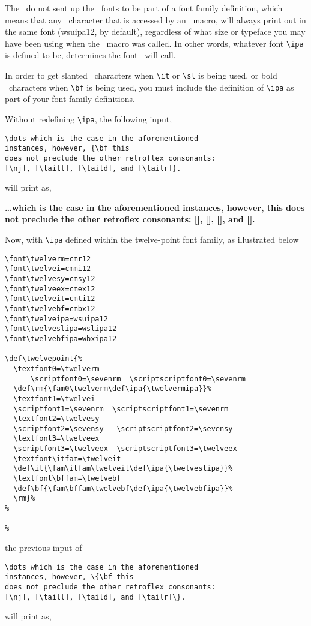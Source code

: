 The \ipam\ do not sent up the \wsu\ fonts to be part of a font family
definition, which means that any \wsu\ character that is accessed by
an \ipam\
macro, will always print out in the same font (wsuipa12, by default),
regardless of what size or typeface you may have been using when
the \ipam\
macro was called. In other words, whatever font \verb?\ipa? is defined to be,
determines the font \ipam\ will call.

In order to get slanted \wsu\ characters when \verb?\it? or \verb?\sl? is being used, or
bold \wsu\ characters when \verb?\bf? is being used, you must include the definition
of \verb?\ipa? as part of your font family definitions.

Without redefining \verb?\ipa?, the following input,

\begin{verbatim}
\dots which is the case in the aforementioned
instances, however, {\bf this
does not preclude the other retroflex consonants:
[\nj], [\taill], [\taild], and [\tailr]}.
\end{verbatim}
\noindent will print as,

\vs{5pt}
{\bf \dots which is the case in the aforementioned instances, however, {\bf this
does not preclude the other retroflex consonants: [\nj], [\taill], [\taild],
and [\tailr]}.
}
\vs{5pt}

Now, with \verb?\ipa? defined within the twelve-point font family, as illustrated
below

\begin{verbatim}
\font\twelverm=cmr12
\font\twelvei=cmmi12
\font\twelvesy=cmsy12
\font\twelveex=cmex12
\font\twelveit=cmti12
\font\twelvebf=cmbx12
\font\twelveipa=wsuipa12
\font\twelveslipa=wslipa12
\font\twelvebfipa=wbxipa12

\def\twelvepoint{%
  \textfont0=\twelverm
      \scriptfont0=\sevenrm  \scriptscriptfont0=\sevenrm
  \def\rm{\fam0\twelverm\def\ipa{\twelvermipa}}%
  \textfont1=\twelvei
  \scriptfont1=\sevenrm  \scriptscriptfont1=\sevenrm
  \textfont2=\twelvesy
  \scriptfont2=\sevensy   \scriptscriptfont2=\sevensy
  \textfont3=\twelveex
  \scriptfont3=\twelveex  \scriptscriptfont3=\twelveex
  \textfont\itfam=\twelveit
  \def\it{\fam\itfam\twelveit\def\ipa{\twelveslipa}}%
  \textfont\bffam=\twelvebf
  \def\bf{\fam\bffam\twelvebf\def\ipa{\twelvebfipa}}%
  \rm}%
%

%
\end{verbatim}
\noindent the previous input of
\begin{verbatim}
\dots which is the case in the aforementioned
instances, however, \{\bf this
does not preclude the other retroflex consonants:
[\nj], [\taill], [\taild], and [\tailr]\}.
\end{verbatim}
\noindent will print as,

